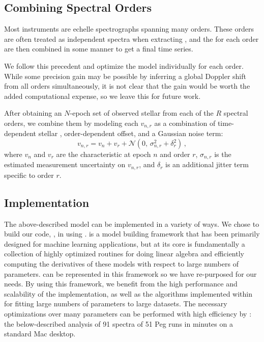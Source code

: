 \documentclass[modern]{aastex62}
\begin{document}
\subsection{Combining Spectral Orders}
\label{s:combining-orders}

Most \EPRV instruments are echelle spectrographs spanning many orders. 
These orders are often treated as independent spectra when extracting \RVs, and the \RVs for each order are then combined in some manner to get a final time series. 

We follow this precedent and optimize the \wobble model individually for each order. 
While some \RV precision gain may be possible by inferring a global Doppler shift from all orders simultaneously, it is not clear that the gain would be worth the added computational expense, so we leave this for future work. 

After obtaining an $N$-epoch set of observed stellar \RVs from each of the $R$ spectral orders, we combine them by modeling each \RV $v_{n,r}$ as a combination of time-dependent stellar \RV, order-dependent \RV offset, and a Gaussian noise term:
\begin{equation}
v_{n,r} = v_n + v_r + \mathcal{N}(0,\,\sigma_{n,r}^{2} + \delta_r^2 )\,,
\end{equation}
where $v_n$ and $v_r$ are the characteristic \RVs at epoch $n$ and order $r$, $\sigma_{n,r}$ is the estimated measurement uncertainty on $v_{n,r}$, and $\delta_r$ is an additional jitter term specific to order $r$. 


\subsection{Implementation}
\label{s:implementation}

The above-described model can be implemented in a variety of ways. We chose to build our code, \wobble, in  using \TF. 
\TF is a model building framework that has been primarily designed for machine
learning applications, but at its core \TF is fundamentally a collection of
highly optimized routines for doing linear algebra and efficiently computing the
derivatives of these models with respect to large numbers of parameters.
\wobble can be represented in this framework so we have re-purposed \TF for our
needs.
By using this framework, we benefit from the high performance and scalability
of the implementation, as well as the algorithms implemented within \TF for
fitting large numbers of parameters to large datasets.
The necessary optimizations over many parameters can be performed with high efficiency by \TF: the below-described analysis of 91 spectra of 51 Peg runs in  minutes on a standard Mac desktop.
\end{document}
